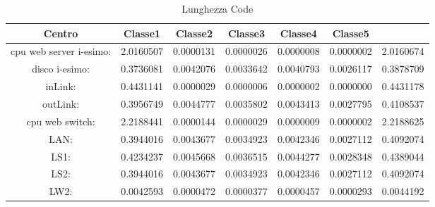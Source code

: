 \begin{table}[H]
\begin{center}\begin{scriptsize}
\begin{tabular}{||c|c|c|c|c|c||}
\hline
Centro &Classe1 &Classe2 &Classe3 &Classe4 &Classe5\\
\hline
\hline
 cpu web server i-esimo: 	&2.0160507	&0.0000131	&0.0000026	&0.0000008	&0.0000002	&2.0160674	\\\hline
 disco i-esimo: 	&0.3736081	&0.0042076	&0.0033642	&0.0040793	&0.0026117	&0.3878709	\\\hline
 inLink: 	&0.4431141	&0.0000029	&0.0000006	&0.0000002	&0.0000000	&0.4431178	\\\hline
 outLink: 	&0.3956749	&0.0044777	&0.0035802	&0.0043413	&0.0027795	&0.4108537	\\\hline
 cpu web switch: 	&2.2188441	&0.0000144	&0.0000029	&0.0000009	&0.0000002	&2.2188625	\\\hline
 LAN: 	&0.3944016	&0.0043677	&0.0034923	&0.0042346	&0.0027112	&0.4092074	\\\hline
 LS1: 	&0.4234237	&0.0045668	&0.0036515	&0.0044277	&0.0028348	&0.4389044	\\\hline
 LS2: 	&0.3944016	&0.0043677	&0.0034923	&0.0042346	&0.0027112	&0.4092074	\\\hline
 LW2: 	&0.0042593	&0.0000472	&0.0000377	&0.0000457	&0.0000293	&0.0044192	\\\hline
\end{tabular}
\end{scriptsize}\end{center}
\caption{Lunghezza Code}
\label{lunghezzacode}
\end{table}

